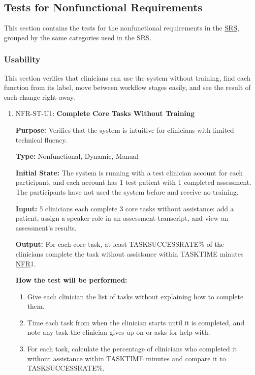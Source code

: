 \documentclass[12pt, titlepage]{article}
\newcommand{\SRSLink}{\href{https://github.com/Nour-Fawaz/MacaBoca/blob/main/pdfs/SRS/SRS.pdf}{SRS}}
\newcommand{\srsnfr}[1]{\href{https://github.com/Nour-Fawaz/MacaBoca/blob/main/pdfs/SRS/SRS.pdf}{NFR}}
\renewcommand{\_}{\oldunderscore\allowbreak}
\begin{document}
\subsection{Tests for Nonfunctional Requirements}

This section contains the tests for the nonfunctional requirements in the \SRSLink{},
grouped by the same categories used in the SRS.
\subsubsection{Usability}
This section verifies that clinicians can use the system without training, find each function from its label, move between workflow stages easily, and see the result of each change right away.
\begin{enumerate}
  \item NFR-ST-U1: \textbf{Complete Core Tasks Without Training\\}
  \begin{mdframed}[linewidth=0.5mm]
      \textbf{Purpose:} Verifies that the system is intuitive for clinicians with limited technical fluency. \par
      \textbf{Type:} Nonfunctional, Dynamic, Manual \par
      \textbf{Initial State:} The system is running with a test clinician account for each participant, and each account has 1 test patient with 1 completed assessment. The participants have not used the system before and receive no training. \par
      \textbf{Input:} 5 clinicians each complete 3 core tasks without assistance: add a patient, assign a speaker role in an assessment transcript, and view an assessment's results. \par
      \textbf{Output:} For each core task, at least TASK\_SUCCESS\_RATE\% of the clinicians complete the task without assistance within TASK\_TIME minutes \srsnfr*{1}. \par
      \textbf{How the test will be performed:}
      \begin{enumerate}
        \item[1.] Give each clinician the list of tasks without explaining how to complete them.
        \item[2.] Time each task from when the clinician starts until it is completed, and note any task the clinician gives up on or asks for help with.
        \item[3.] For each task, calculate the percentage of clinicians who completed it without assistance within TASK\_TIME minutes and compare it to TASK\_SUCCESS\_RATE\%.
      \end{enumerate}
  \end{mdframed}


\end{enumerate}
\end{document}
